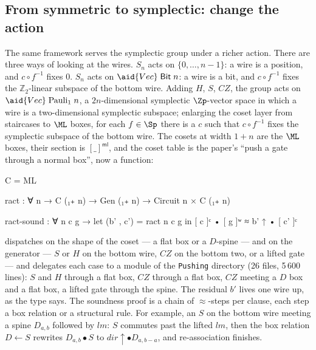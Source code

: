\subsection{From symmetric to symplectic: change the action}\label{sec:pushing}

The same framework serves the symplectic group under a richer action.
There are three ways of looking at the wires.  $S_n$ acts on
$\{0,\dots,n-1\}$: a wire is a position, and $c \circ f^{-1}$ fixes
$0$.  $S_n$ acts on $\aid{Vec}\;\mathsf{Bit}\;n$: a wire is a bit, and
$c \circ f^{-1}$ fixes the $\mathbb{Z}_2$-linear subspace of the bottom
wire.  Adding $H$, $S$, $CZ$, the group acts on
$\aid{Vec}\;\mathrm{Pauli}_1\;n$, a $2n$-dimensional symplectic
$\Zp$-vector space in which a wire is a two-dimensional symplectic
subspace; enlarging the coset layer from staircases to $\ML$ boxes, for
each $f \in \Sp$ there is a $c$ such that $c \circ f^{-1}$ fixes the
symplectic subspace of the bottom wire.  The cosets at width $1{+}n$
are the $\ML$ boxes, their section is $[\_]^{\mathsf{ml}}$, and the coset
table is the paper's ``push a gate through a normal box'', now a
function:

\begin{agdacode}
C = ML

ract : ∀ {n} → C (₁₊ n) → Gen (₁₊ n) → Circuit n × C (₁₊ n)

ract-sound : ∀ {n} c g →
  let (b' , c') = ract {n} c g
  in [ c ]ᶜ • [ g ]ʷ ≈ b' ↑ • [ c' ]ᶜ
\end{agdacode}

 dispatches on the shape of the coset --- a flat box or a
$D$-spine --- and on the generator --- $S$ or $H$ on the bottom wire,
$CZ$ on the bottom two, or a lifted gate --- and delegates each case to
a module of the \texttt{Pushing} directory (26 files, 5\,600 lines):
$S$ and $H$ through a flat box, $CZ$ through a flat box, $CZ$ meeting a
$D$ box and a flat box, a lifted gate through the spine.  The residual
$b'$ lives one wire up, as the type says.  The soundness proof
 is a chain of $\approx$-steps per clause, each step a
box relation or a structural rule.  For example, an $S$ on the bottom
wire meeting a spine $D_{a,b}$ followed by $\mathit{lm}$: $S$ commutes
past the lifted $\mathit{lm}$, then the box relation
$D \leftarrow S$ rewrites $D_{a,b} \bullet S$ to $\mathit{dir}{\uparrow}
\bullet D_{a,b-a}$, and re-association finishes.

